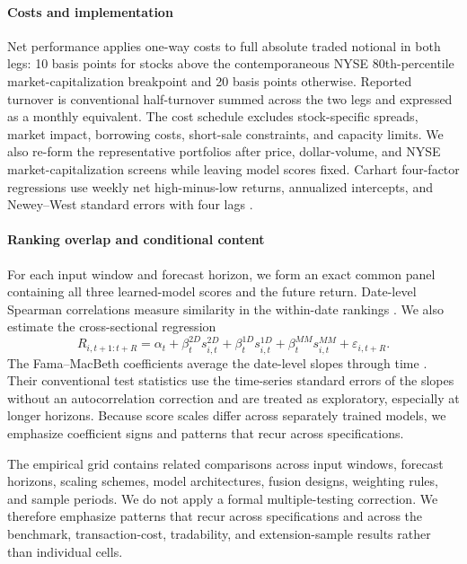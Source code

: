 \paragraph{Costs and implementation} Net performance applies one-way costs to full absolute traded notional in both legs: 10 basis points for stocks above the contemporaneous NYSE 80th-percentile market-capitalization breakpoint and 20 basis points otherwise. Reported turnover is conventional half-turnover summed across the two legs and expressed as a monthly equivalent. The cost schedule excludes stock-specific spreads, market impact, borrowing costs, short-sale constraints, and capacity limits. We also re-form the representative portfolios after price, dollar-volume, and NYSE market-capitalization screens while leaving model scores fixed. Carhart four-factor regressions use weekly net high-minus-low returns, annualized intercepts, and Newey--West standard errors with four lags \parencite{carhartPersistenceMutualFund1997}.

\paragraph{Ranking overlap and conditional content} For each input window and forecast horizon, we form an exact common panel containing all three learned-model scores and the future return. Date-level Spearman correlations measure similarity in the within-date rankings \parencite{spearmanProofMeasurementAssociation1904}. We also estimate the cross-sectional regression
\begin{equation}
 R_{i,t+1:t+R}=\alpha_t+\beta^{2D}_t s^{2D}_{i,t}
 +\beta^{1D}_t s^{1D}_{i,t}+\beta^{MM}_t s^{MM}_{i,t}
 +\varepsilon_{i,t+R}.
 \label{eq:joint_fmb}
\end{equation}
The Fama--MacBeth coefficients average the date-level slopes through time \parencite{famaRiskReturnEquilibrium1973}. Their conventional test statistics use the time-series standard errors of the slopes without an autocorrelation correction and are treated as exploratory, especially at longer horizons. Because score scales differ across separately trained models, we emphasize coefficient signs and patterns that recur across specifications.

The empirical grid contains related comparisons across input windows, forecast horizons, scaling schemes, model architectures, fusion designs, weighting rules, and sample periods. We do not apply a formal multiple-testing correction. We therefore emphasize patterns that recur across specifications and across the benchmark, transaction-cost, tradability, and extension-sample results rather than individual cells.
